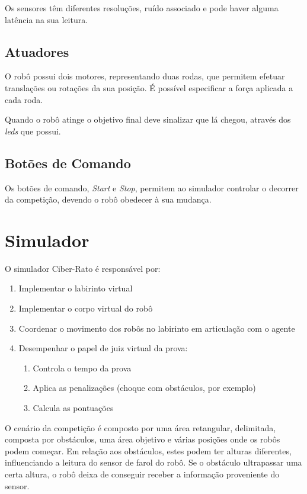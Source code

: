 \documentclass[citeauthoryear]{llncs} %
\begin{document}
Os sensores têm diferentes resoluções, ruído associado e pode haver alguma latência na sua leitura.

\subsection{Atuadores}

O robô possui dois motores, representando duas rodas, que permitem efetuar translações ou rotações da sua posição. É possível especificar a força aplicada a cada roda. 

Quando o robô atinge o objetivo final deve sinalizar que lá chegou, através dos \emph{leds} que possui. 

\subsection{Botões de Comando}
Os botões de comando, \emph{Start} e \emph{Stop}, permitem ao simulador controlar o decorrer da competição, devendo o robô obedecer à sua mudança.

\section{Simulador}

O simulador Ciber-Rato é responsável por:
\begin{enumerate} 
\item Implementar o labirinto virtual 
\item Implementar o corpo virtual do robô
\item Coordenar o movimento dos robôs no labirinto em articulação com o agente
\item Desempenhar o papel de juiz virtual da prova:
\begin{enumerate} 
\item Controla o tempo da prova
\item Aplica as penalizações (choque com obstáculos, por exemplo)
\item Calcula as pontuações
\end{enumerate}
\end{enumerate}

O cenário da competição é composto por uma área retangular, delimitada, composta por obstáculos, uma área objetivo e várias posições onde os robôs podem começar. Em relação aos obstáculos, estes podem ter alturas diferentes, influenciando a leitura do sensor de farol do robô. Se o obstáculo ultrapassar uma certa altura, o robô deixa de conseguir receber a informação proveniente do sensor. 
\end{document}
